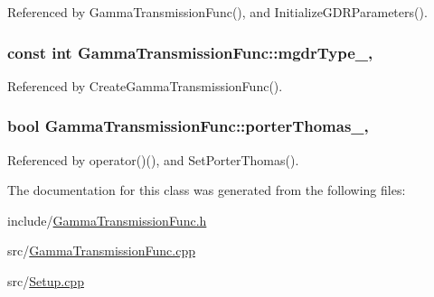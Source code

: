 Referenced by Gamma\-Transmission\-Func(), and Initialize\-G\-D\-R\-Parameters().

\hypertarget{classGammaTransmissionFunc_ae885f247bb9f13b1ff11aca3626e4069}{
\subsubsection[{mgdr\-Type\-\_\-}]{\setlength{\rightskip}{0pt plus 5cm}const int Gamma\-Transmission\-Func\-::mgdr\-Type\-\_\hspace{0.3cm}{\ttfamily [static]}, {\ttfamily [protected]}}}\label{classGammaTransmissionFunc_ae885f247bb9f13b1ff11aca3626e4069}


Referenced by Create\-Gamma\-Transmission\-Func().

\hypertarget{classGammaTransmissionFunc_a60dd0efc70eea322e8ca51432418cca2}{
\subsubsection[{porter\-Thomas\-\_\-}]{\setlength{\rightskip}{0pt plus 5cm}bool Gamma\-Transmission\-Func\-::porter\-Thomas\-\_\-\hspace{0.3cm}{\ttfamily [static]}, {\ttfamily [protected]}}}\label{classGammaTransmissionFunc_a60dd0efc70eea322e8ca51432418cca2}


Referenced by operator()(), and Set\-Porter\-Thomas().



The documentation for this class was generated from the following files\-:\begin{DoxyCompactItemize}
\item 
include/\hyperlink{GammaTransmissionFunc_8h}{Gamma\-Transmission\-Func.\-h}\item 
src/\hyperlink{GammaTransmissionFunc_8cpp}{Gamma\-Transmission\-Func.\-cpp}\item 
src/\hyperlink{Setup_8cpp}{Setup.\-cpp}\end{DoxyCompactItemize}
